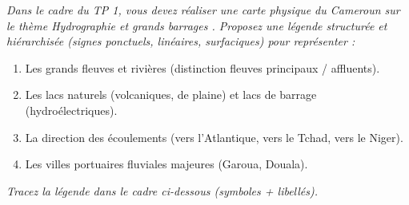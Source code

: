 \documentclass[11pt]{article}
\begin{document}
\begin{exercice}
\emph{Dans le cadre du TP 1, vous devez réaliser une carte physique du Cameroun sur le thème \og Hydrographie et grands barrages \fg. Proposez une légende structurée et hiérarchisée (signes ponctuels, linéaires, surfaciques) pour représenter :}
\begin{enumerate}
    \item Les grands fleuves et rivières (distinction fleuves principaux / affluents).
    \item Les lacs naturels (volcaniques, de plaine) et lacs de barrage (hydroélectriques).
    \item La direction des écoulements (vers l'Atlantique, vers le Tchad, vers le Niger).
    \item Les villes portuaires fluviales majeures (Garoua, Douala).
\end{enumerate}
\emph{Tracez la légende dans le cadre ci-dessous (symboles + libellés).}
\vspace{4cm} %
\end{exercice}
\end{document}
